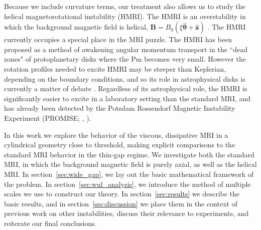 \documentclass{emulateapj}
\newcommand{\citei}[1]{\citeauthor{#1} \citeyear{#1}}
\newcommand{\Pm}{\mathrm{Pm}}
\begin{document}
Because we include curvature terms, our treatment also allows us to study the helical magnetorotational instability (HMRI). The HMRI is an overstability in which the background magnetic field is helical, $\mathbf{B} = B_0 (\xi \mathbf{\hat{\theta}} + \mathbf{\hat{z}})$ \citet{Hollerbach:2005tr}. The HMRI currently occupies a special place in the MRI puzzle. The HMRI has been proposed as a method of awakening angular momentum transport in the ``dead zones" of protoplanetary disks where the $\Pm$ becomes very small. However the rotation profiles needed to excite HMRI may be steeper than Keplerian, depending on the boundary conditions, and so its role in astrophysical disks is currently a matter of debate \citep{Liu:2006,Rudiger:2007,Kirillov:2013}. Regardless of its astrophysical role, the HMRI is significantly easier to excite in a laboratory setting than the standard MRI, and has already been detected by the Potsdam Rossendorf Magnetic Instability Experiment (PROMISE; \citei{Stefani:2006iv}, \citei{Stefani:2009hp}).

In this work we explore the behavior of the viscous, dissipative MRI in a cylindrical geometry close to threshold, making explicit comparisons to the standard MRI behavior in the thin-gap regime. We investigate both the standard MRI, in which the background magnetic field is purely axial, as well as the helical MRI. In section~\ref{sec:wide_gap}, we lay out the basic mathematical framework of the problem. In section~\ref{sec:wnl_analysis}, we introduce the method of multiple scales we use to construct our theory. In section~\ref{sec:results} we describe the basic results, and in section~\ref{sec:discussion} we place them in the context of previous work on other instabilities, discuss their relevance to experiments, and reiterate our final conclusions.
\end{document}
